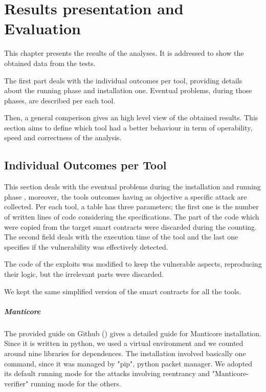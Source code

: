 
\chapter{Results presentation and Evaluation}
\label{ch:Evaluation}
This chapter presents the results of the analyses. It is addressed to show the obtained data from the tests.

The first part deals with the individual outcomes per tool, providing details about the running phase and installation one.
Eventual problems, during those phases, are described per each tool.

Then, a general comperison gives an high level view of the obtained results.
This section aims to define which tool had a better behaviour in term of operability, speed and correctness of the analysis. 




\section{Individual Outcomes per Tool}

This section deals with the eventual problems during the installation and running phase , 
moreover, the tools outcomes having as objective a specific attack are collected. 
Per each tool, a table has three parameters; the first one is the number of written lines of code considering the specifications. 
The part of the code which were copied from the target smart contracts were discarded during the counting. 
The second field deals with the execution time of the tool and the last one specifies if the vulnerability was effectively detected.

The code of the exploits was modified to keep the vulnerable aspects, reproducing their logic, but the irrelevant parts were discarded.

We kept the same simplified version of the smart contracts for all the tools.

\paragraph{Manticore} The provided guide on Github (\cite{ManticoreGitHub}) gives a detailed guide for Manticore installation. 
Since it is written in python, we used a virtual environment and we counted around nine libraries for dependences. 
The installation involved basically one command, since it was managed by "pip", python packet manager.
We adopted its default running mode for the attacks involving reentrancy and "Manticore-verifier" running mode for the others. 

